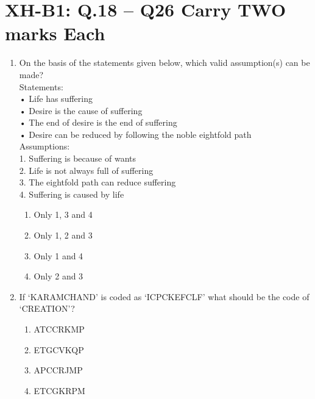 \documentclass{article}
\begin{document}
\section*{XH-B1: Q.18 – Q26 Carry TWO marks Each}
\begin{enumerate}[leftmargin=*, start=18, label=Q.\arabic*.]
    \item On the basis of the statements given below, which valid assumption(s) can be made? \\
    Statements: \\
    • Life has suffering \\
    • Desire is the cause of suffering \\
    • The end of desire is the end of suffering \\
    • Desire can be reduced by following the noble eightfold path \\
    Assumptions: \\
    1. Suffering is because of wants \\
    2. Life is not always full of suffering \\ 
    3. The eightfold path can reduce suffering \\ 
    4. Suffering is caused by life
    
    \begin{multicols}{4}
        \begin{enumerate}
            \item Only 1, 3 and 4
            \item Only 1, 2 and 3
            \item Only 1 and 4
            \item Only 2 and 3
        \end{enumerate}
    \end{multicols}

    \item If ‘KARAMCHAND’ is coded as ‘ICPCKEFCLF’ what should be the code of ‘CREATION’?
    
    \begin{multicols}{4}
        \begin{enumerate}
            \item ATCCRKMP
            \item ETGCVKQP
            \item APCCRJMP
            \item ETCGKRPM
        \end{enumerate}
    \end{multicols}


\end{enumerate}
\end{document}
